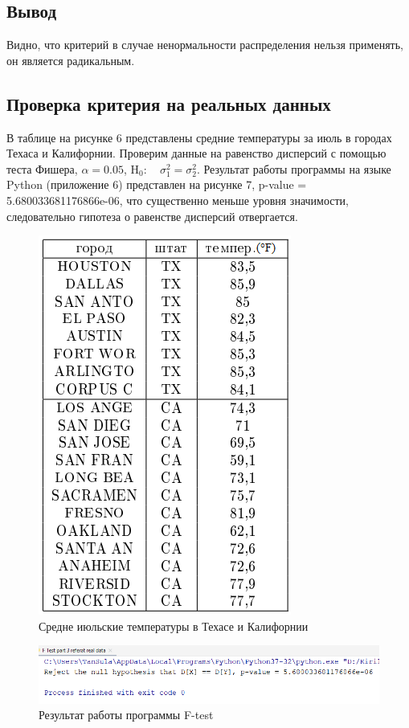 \documentclass[12pt]{disser}
\begin{document}
\newpage

\subsection*{Вывод}
Видно, что критерий в случае ненормальности распределения нельзя применять, он является радикальным. 

\subsection*{Проверка критерия на реальных данных}
В таблице на рисунке 6 представлены средние температуры за июль в городах Техаса и Калифорнии. Проверим данные на равенство дисперсий с помощью теста Фишера, $\alpha = 0.05$, $\mathrm{H}_{0}: \quad \sigma_{1}^{2}=\sigma_{2}^{2}$. Результат работы программы на языке Python (приложение 6) представлен на рисунке 7, p-value = 5.680033681176866e-06, что существенно меньше уровня значимости, следовательно гипотеза о равенстве дисперсий отвергается. 

\begin{figure}[h]
	\centering
	\includegraphics[width=0.4\linewidth]{table.png}
	\caption{Средне июльские температуры в Техасе и Калифорнии}
	\label{fig:mpr}
\end{figure}

\begin{figure}[h]
	\centering
	\includegraphics[width=0.8\linewidth]{Screenshot_1.png}
	\caption{Результат работы программы F-test}
	\label{fig:mpr}
\end{figure}
\end{document}
